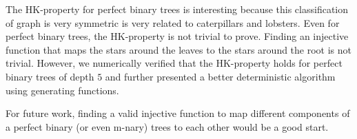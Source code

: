 \documentclass{amsart}
\theoremstyle{definition}
\begin{document}
The HK-property for perfect binary trees is interesting because this classification of graph is very symmetric is very related to caterpillars and lobsters. Even for perfect binary trees, the HK-property is not trivial to prove. Finding an injective function that maps the stars around the leaves to the stars around the root is not trivial. However, we numerically verified that the HK-property holds for perfect binary trees of depth $5$ and further presented a better deterministic algorithm using generating functions.

For future work, finding a valid injective function to map different components of a perfect binary (or even m-nary) trees to each other would be a good start. 

\newpage

\end{document}
